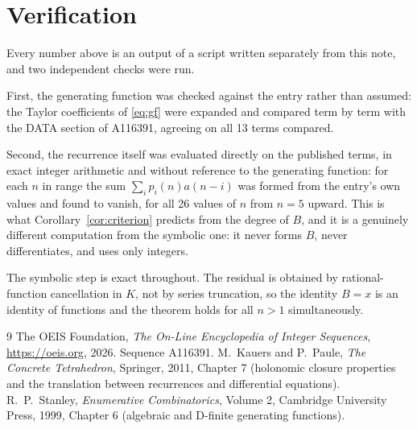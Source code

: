 \documentclass[11pt,a4paper]{article}
\theoremstyle{plain}
\theoremstyle{definition}
\begin{document}
\section{Verification}

Every number above is an output of a script written separately from this note, and two
independent checks were run.

First, the generating function was checked against the entry rather than assumed: the
Taylor coefficients of \eqref{eq:gf} were expanded and compared term by term with the DATA
section of A116391, agreeing on all 13 terms compared.

Second, the recurrence itself was evaluated directly on the published terms, in exact
integer arithmetic and without reference to the generating function: for each $n$ in range
the sum $\sum_{i}p_{i}(n)a(n-i)$ was formed from the entry's own values and found to
vanish, for all 26 values of $n$ from $n=5$ upward. This is what
Corollary~\ref{cor:criterion} predicts from the degree of $B$, and it is a genuinely
different computation from the symbolic one: it never forms $B$, never differentiates, and
uses only integers.

The symbolic step is exact throughout. The residual is obtained by rational-function
cancellation in $K$, not by series truncation, so the identity $B=x$ is an
identity of functions and the theorem holds for all $n>1$ simultaneously.

\begin{thebibliography}{9}
 The OEIS Foundation, \emph{The On-Line Encyclopedia of Integer Sequences},
\url{https://oeis.org}, 2026. Sequence A116391.
 M.~Kauers and P.~Paule, \emph{The Concrete Tetrahedron}, Springer, 2011,
Chapter 7 (holonomic closure properties and the translation between recurrences and
differential equations).
 R.~P.~Stanley, \emph{Enumerative Combinatorics}, Volume 2, Cambridge
University Press, 1999, Chapter 6 (algebraic and D-finite generating functions).
\end{thebibliography}
\end{document}
